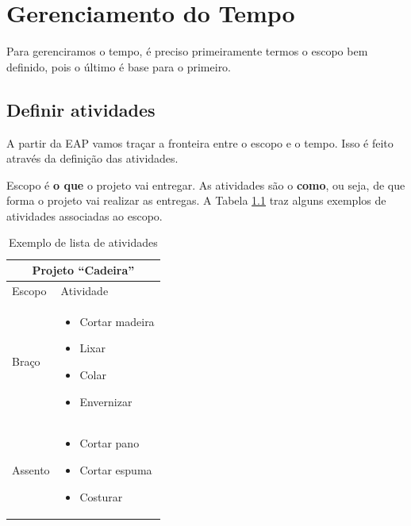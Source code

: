 
\chapter{Gerenciamento do Tempo}

Para gerenciramos o tempo, é preciso primeiramente termos o escopo bem definido, pois o último é base para o primeiro.

\section{Definir atividades}

A partir da EAP vamos traçar a fronteira entre o escopo e o tempo. Isso é feito através da definição das atividades.

Escopo é \textbf{o que} o projeto vai entregar. As atividades são o \textbf{como}, ou seja, de que forma o projeto vai realizar as entregas. A Tabela \ref{tab:ativ:ex} traz alguns exemplos de atividades associadas ao escopo.

\begin{table}[h!]\footnotesize
\centering
\begin{tabular}
{
 	|p{}
	| >{\centering\arraybackslash}p{}|
}

	\hline

	\multicolumn{2}{c}{Projeto ``Cadeira''}\\
	
	\hline
	
	Escopo&
	Atividade\\
	
	\hline

	Braço&
	\begin{itemize}
		\item Cortar madeira
		\item Lixar
		\item Colar
		\item Envernizar
	\end{itemize}\\
	
	\hline

	Assento&
	\begin{itemize}
		\item Cortar pano
		\item Cortar espuma
		\item Costurar
	\end{itemize}\\

	\hline

\end{tabular}
\caption {Exemplo de lista de atividades}
\label{tab:ativ:ex}
\end{table}

